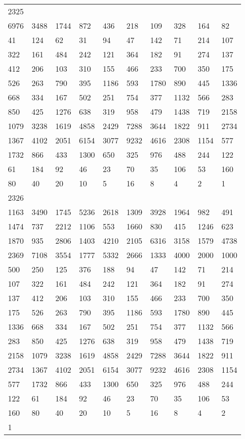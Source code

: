 \begin{longtable}{*{10}{l}}
2325&&&&&&&&&\\
6976& 3488& 1744& 872& 436& 218& 109& 328& 164& 82\\
41& 124& 62& 31& 94& 47& 142& 71& 214& 107\\
322& 161& 484& 242& 121& 364& 182& 91& 274& 137\\
412& 206& 103& 310& 155& 466& 233& 700& 350& 175\\
526& 263& 790& 395& 1186& 593& 1780& 890& 445& 1336\\
668& 334& 167& 502& 251& 754& 377& 1132& 566& 283\\
850& 425& 1276& 638& 319& 958& 479& 1438& 719& 2158\\
1079& 3238& 1619& 4858& 2429& 7288& 3644& 1822& 911& 2734\\
1367& 4102& 2051& 6154& 3077& 9232& 4616& 2308& 1154& 577\\
1732& 866& 433& 1300& 650& 325& 976& 488& 244& 122\\
61& 184& 92& 46& 23& 70& 35& 106& 53& 160\\
80& 40& 20& 10& 5& 16& 8& 4& 2& 1\\

2326&&&&&&&&&\\
1163& 3490& 1745& 5236& 2618& 1309& 3928& 1964& 982& 491\\
1474& 737& 2212& 1106& 553& 1660& 830& 415& 1246& 623\\
1870& 935& 2806& 1403& 4210& 2105& 6316& 3158& 1579& 4738\\
2369& 7108& 3554& 1777& 5332& 2666& 1333& 4000& 2000& 1000\\
500& 250& 125& 376& 188& 94& 47& 142& 71& 214\\
107& 322& 161& 484& 242& 121& 364& 182& 91& 274\\
137& 412& 206& 103& 310& 155& 466& 233& 700& 350\\
175& 526& 263& 790& 395& 1186& 593& 1780& 890& 445\\
1336& 668& 334& 167& 502& 251& 754& 377& 1132& 566\\
283& 850& 425& 1276& 638& 319& 958& 479& 1438& 719\\
2158& 1079& 3238& 1619& 4858& 2429& 7288& 3644& 1822& 911\\
2734& 1367& 4102& 2051& 6154& 3077& 9232& 4616& 2308& 1154\\
577& 1732& 866& 433& 1300& 650& 325& 976& 488& 244\\
122& 61& 184& 92& 46& 23& 70& 35& 106& 53\\
160& 80& 40& 20& 10& 5& 16& 8& 4& 2\\
1& \\


\end{longtable}
